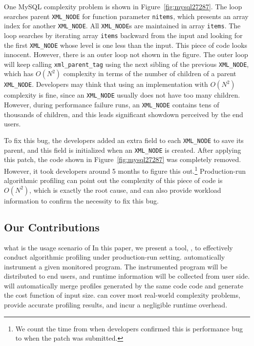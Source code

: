 


One MySQL complexity problem is shown in Figure~\ref{fig:mysql27287}.
The loop searches parent \texttt{XML\_NODE} for function parameter \texttt{nitems},
which presents an array index for another \texttt{XML\_NODE}.
All \texttt{XML\_NODE}s are maintained in array \texttt{items}.
The loop searches by iterating array \texttt{items}
backward from the input and looking for the first \texttt{XML\_NODE}
whose level is one less than the input.
This piece of code looks innocent.
However, there is an outer loop not shown in the figure.
The outer loop will keep calling \texttt{xml\_parent\_tag} using
the next sibling of the previous \texttt{XML\_NODE},
which has $O(N^2)$ complexity in terms of the number of children of a parent \texttt{XML\_NODE}.
Developers may think that using an implementation with $O(N^2)$ complexity is fine,
since an \texttt{XML\_NODE} usually does not have too many children.
However, during performance failure runs,
an \texttt{XML\_NODE} contains tens of thousands of children,
and this leads significant showdown perceived by the end users.

To fix this bug, the developers added an extra field to each \texttt{XML\_NODE} to save its parent,
and this field is initialized when an \texttt{XML\_NODE} is created.
After applying this patch, the code shown in Figure~\ref{fig:mysql27287} was completely removed.
However, it took developers around 5 months to figure this
out.\footnote{We count the time from when developers confirmed this is performance bug
to when the patch was submitted.}
Production-run algorithmic profiling 
can point out the complexity of this piece of code is $O(N^2)$, 
which is exactly the root cause, 
and can also provide workload information 
to confirm the necessity to fix this bug.


\subsection{Our Contributions}
\label{sec:con}

{\color{red} what is the usage scenario of \Tool}
In this paper,
we present a tool, \Tool, to effectively conduct algorithmic profiling 
under production-run setting.
\Tool automatically instrument a given monitored program.
The instrumented program will be distributed to end users, 
and runtime information will be collected from user side. 
\Tool will automatically merge profiles generated by the same code code 
and generate the cost function of input size. 
\Tool can cover most real-world complexity problems, 
provide accurate profiling results, and incur a negligible runtime overhead. 

